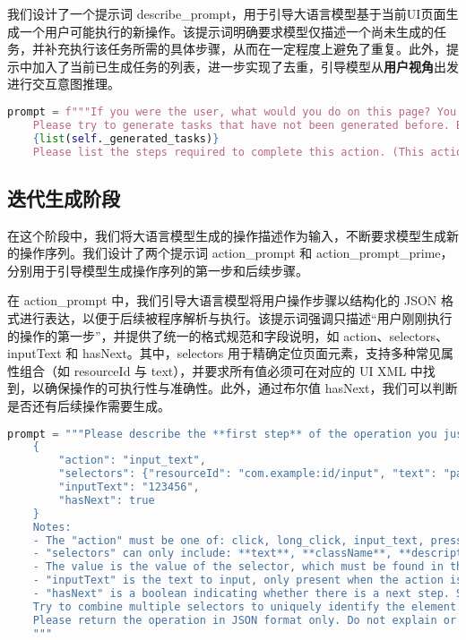 \documentclass{article}
\begin{document}
我们设计了一个提示词 describe\_prompt，用于引导大语言模型基于当前UI页面生成一个用户可能执行的新操作。该提示词明确要求模型仅描述一个尚未生成的任务，并补充执行该任务所需的具体步骤，从而在一定程度上避免了重复。此外，提示中加入了当前已生成任务的列表，进一步实现了去重，引导模型从\textbf{用户视角}出发进行交互意图推理。

\begin{lstlisting}[language=python, caption=操作描述]
    prompt = f"""If you were the user, what would you do on this page? You can only describe one action. 
    Please try to generate tasks that have not been generated before. Below are the tasks that have already been generated:
    {list(self._generated_tasks)}
    Please list the steps required to complete this action. (This action will be named 'The Task')"""
\end{lstlisting}

\subsection{迭代生成阶段}

在这个阶段中，我们将大语言模型生成的操作描述作为输入，不断要求模型生成新的操作序列。我们设计了两个提示词 action\_prompt 和 action\_prompt\_prime，分别用于引导模型生成操作序列的第一步和后续步骤。

在 action\_prompt 中，我们引导大语言模型将用户操作步骤以结构化的 JSON 格式进行表达，以便于后续被程序解析与执行。该提示词强调只描述“用户刚刚执行的操作的第一步”，并提供了统一的格式规范和字段说明，如 action、selectors、inputText 和 hasNext。其中，selectors 用于精确定位页面元素，支持多种常见属性组合（如 resourceId 与 text），并要求所有值必须可在对应的 UI XML 中找到，以确保操作的可执行性与准确性。此外，通过布尔值 hasNext，我们可以判断是否还有后续操作需要生成。

\begin{lstlisting}[language=python, caption=初始事件生成]
    prompt = """Please describe the **first step** of the operation you just performed in JSON format, as shown below:
    {
        "action": "input_text",
        "selectors": {"resourceId": "com.example:id/input", "text": "password"},
        "inputText": "123456",
        "hasNext": true
    }
    Notes:
    - The "action" must be one of: click, long_click, input_text, press_enter
    - "selectors" can only include: **text**, **className**, **description**, **resourceId**, and must be in camelCase. You can not use other selectors.
    - The value is the value of the selector, which must be found in the previous XML
    - "inputText" is the text to input, only present when the action is input_text
    - "hasNext" is a boolean indicating whether there is a next step. Set it to false if there is no next step
    Try to combine multiple selectors to uniquely identify the element.
    Please return the operation in JSON format only. Do not explain or use code blocks.
    """
\end{lstlisting}
\end{document}
